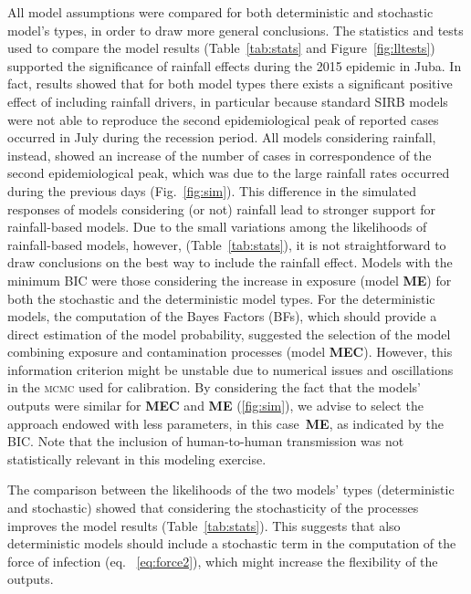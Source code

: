 All model assumptions were compared for both deterministic and stochastic model's types, in order to draw more general conclusions. The statistics and tests used to compare the model results  (Table~\ref{tab:stats} and Figure~\ref{fig:lltests}) supported the significance of rainfall effects during the 2015 epidemic in Juba. In fact, results showed that for both model types there exists a significant positive effect of including rainfall drivers, in particular because standard SIRB models were not able to reproduce the second epidemiological peak of reported cases occurred in July during the recession period. All models considering rainfall, instead, showed an increase of the number of cases in correspondence of the second epidemiological peak, which was due to the large rainfall rates occurred during the previous days (Fig.~\ref{fig:sim}). 
This difference in the simulated responses of models considering (or not) rainfall lead to stronger support for rainfall-based models. Due to the small variations among the likelihoods of rainfall-based models, however,  (Table~\ref{tab:stats}), it is not straightforward to draw conclusions on the best way to include the rainfall effect.
Models with the minimum BIC were those considering the increase in exposure (model \textbf{ME}) for both the stochastic and the deterministic model types. For the deterministic models, the computation of the Bayes Factors (BFs), which should provide a direct estimation of the model probability, suggested the selection of the model combining exposure and contamination processes (model \textbf{MEC}). However, this information criterion might be unstable due to numerical issues and oscillations in the \textsc{mcmc} used for calibration\cite{Raftery:EstimatingIntegratedLikelihood:2007}. By considering the fact that the models' outputs were similar for \textbf{MEC} and \textbf{ME} (\ref{fig:sim}), we advise to select the approach endowed with less parameters, in this case~\textbf{ME}, as indicated by the BIC. Note that the inclusion of human-to-human transmission was not statistically relevant in this modeling exercise.

The comparison between the likelihoods of the two models' types (deterministic and stochastic) showed that considering the stochasticity of the processes improves the model results (Table~\ref{tab:stats}). This suggests that also deterministic models should include a stochastic term in the computation of the force of infection (eq. ~\ref{eq:force2}), which might increase the flexibility of the outputs.

